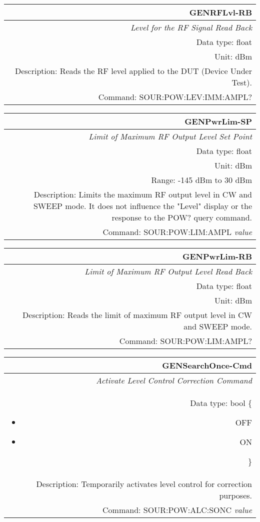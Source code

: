 \documentclass[openany]{article}
\begin{document}
		\begin{tabular}{N}
			\hline
			\bfseries GENRFLvl-RB \\ \hline
			\emph{Level for the RF Signal Read Back} \\
			Data type: float \\
			Unit: dBm \\
			Description: Reads the RF level applied to the DUT (Device Under Test). \\
			Command: SOUR:POW:LEV:IMM:AMPL? \\

		\end{tabular}
%
		\begin{tabular}{N}
			\hline
			\bfseries GENPwrLim-SP \\ \hline
			\emph{Limit of Maximum RF Output Level Set Point} \\
			Data type: float \\
			Unit: dBm \\
			Range: -145 dBm to 30 dBm \\
			Description: Limits the maximum RF output level in CW and SWEEP mode. It does not influence the "Level" display or the response to the POW? query command. \\
			Command: SOUR:POW:LIM:AMPL \emph{value} \\
			
		\end{tabular}


		\begin{tabular}{N}
			\hline
			\bfseries GENPwrLim-RB \\ \hline
			\emph{Limit of Maximum RF Output Level Read Back} \\
			Data type: float \\
			Unit: dBm \\
			Description: Reads the limit of maximum RF output level in CW and SWEEP mode. \\
			Command: SOUR:POW:LIM:AMPL? \\

		\end{tabular}
%
		\begin{tabular}{N}
			\hline
			\bfseries GENSearchOnce-Cmd \\ \hline
			\emph{Activate Level Control Correction Command} \\
			Data type: bool \{\begin{itemize}[noitemsep]
				\small
				\item[] OFF
				\item[] ON
			\end{itemize}\} \\
			Description: Temporarily activates level control for correction purposes. \\
			Command: SOUR:POW:ALC:SONC \emph{value} \\

		\end{tabular}
%
\end{document}
